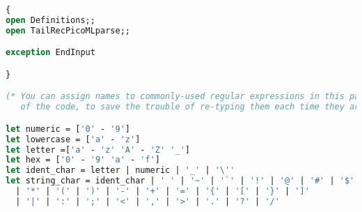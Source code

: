 \begin{lstlisting}[language=Caml, caption=tailRecPicoMLlex.mll]
{
open Definitions;;
open TailRecPicoMLparse;;

exception EndInput

}

(* You can assign names to commonly-used regular expressions in this part
   of the code, to save the trouble of re-typing them each time they are used *)

let numeric = ['0' - '9']
let lowercase = ['a' - 'z']
let letter =['a' - 'z' 'A' - 'Z' '_']
let hex = ['0' - '9' 'a' - 'f']
let ident_char = letter | numeric | '_' | '\''
let string_char = ident_char | ' ' | '~' | '`' | '!' | '@' | '#' | '$' | '%' | '^' | '&'
  | '*' | '(' | ')' | '-' | '+' | '=' | '{' | '[' | '}' | ']'
  | '|' | ':' | ';' | '<' | ',' | '>' | '.' | '?' | '/' 


\end{lstlisting}
